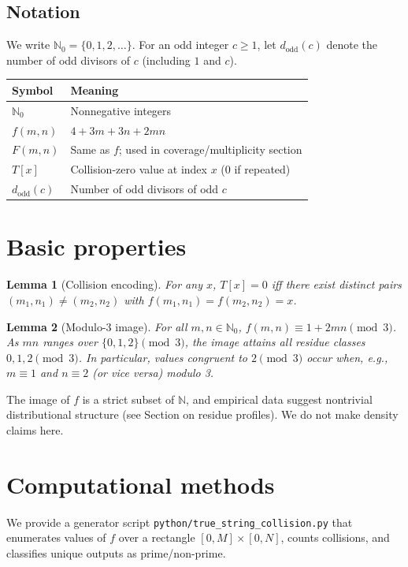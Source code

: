 \documentclass[12pt,a4paper]{article}
\newtheorem{lemma}{Lemma}[section]
\begin{document}
\subsection*{Notation}
We write \(\mathbb{N}_0=\{0,1,2,\dots\}\). For an odd integer \(c\ge 1\), let \(d_{\mathrm{odd}}(c)\) denote the number of odd divisors of \(c\) (including \(1\) and \(c\)).

\begin{center}
\begin{tabular}{l l}
Symbol & Meaning \\
\hline
\(\mathbb{N}_0\) & Nonnegative integers \\
\(f(m,n)\) & \(4+3m+3n+2mn\) \\
\(F(m,n)\) & Same as \(f\); used in coverage/multiplicity section \\
\(T[x]\) & Collision-zero value at index \(x\) (0 if repeated) \\
\(d_{\mathrm{odd}}(c)\) & Number of odd divisors of odd \(c\) \\
\end{tabular}
\end{center}

\section{Basic properties}
\begin{lemma}[Collision encoding]\label{lem:collision}
For any \(x\), \(T[x]=0\) iff there exist distinct pairs \((m_1,n_1)\ne(m_2,n_2)\) with \(f(m_1,n_1)=f(m_2,n_2)=x\).
\end{lemma}

\begin{lemma}[Modulo-3 image]\label{lem:mod3}
For all \(m,n\in\mathbb{N}_0\), \(f(m,n) \equiv 1 + 2mn \pmod{3}\). As \(mn\) ranges over \(\{0,1,2\}\pmod{3}\), the image attains all residue classes \(0,1,2\pmod{3}\). In particular, values congruent to \(2\pmod{3}\) occur when, e.g., \(m\equiv 1\) and \(n\equiv 2\) (or vice versa) modulo 3.
\end{lemma}

\begin{remark}\label{rem:sparse}
The image of \(f\) is a strict subset of \(\mathbb{N}\), and empirical data suggest nontrivial distributional structure (see Section on residue profiles). We do not make density claims here.
\end{remark}

\section{Computational methods}
We provide a generator script \texttt{python/true\_string\_collision.py} that enumerates values of \(f\) over a rectangle \([0,M]\times[0,N]\), counts collisions, and classifies unique outputs as prime/non-prime.
\end{document}
